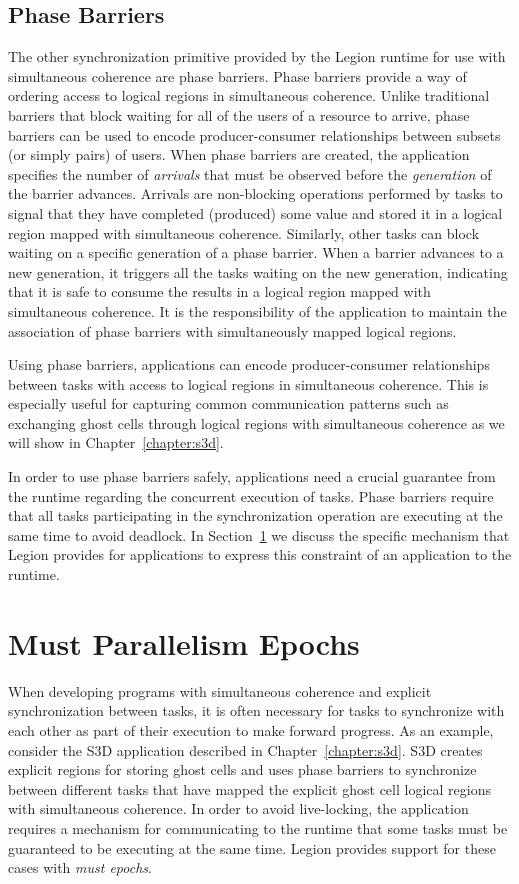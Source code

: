 \subsection{Phase Barriers}
\label{subsec:phasebarriers}
The other synchronization primitive provided by the
Legion runtime for use with simultaneous coherence
are phase barriers. Phase barriers provide a way of
ordering access to logical regions in simultaneous
coherence. Unlike traditional barriers that block
waiting for all of the users of a resource to arrive,
phase barriers can be used to encode producer-consumer
relationships between subsets (or simply pairs) of
users. When phase barriers are created, the application
specifies the number of {\em arrivals} that must be 
observed before the {\em generation} of the barrier
advances. Arrivals are non-blocking operations performed
by tasks to signal that they have completed (produced)
some value and stored it in a logical region mapped with
simultaneous coherence. Similarly, other tasks can 
block waiting on a specific generation of a phase 
barrier. When a barrier advances to a new generation,
it triggers all the tasks waiting on the new generation,
indicating that it is safe to consume the results in a
logical region mapped with simultaneous coherence. It
is the responsibility of the application to maintain the 
association of phase barriers with simultaneously 
mapped logical regions.

Using phase barriers, applications can encode
producer-consumer relationships between tasks with
access to logical regions in simultaneous coherence.
This is especially useful for capturing common
communication patterns such as exchanging ghost cells
through logical regions with simultaneous coherence
as we will show in Chapter~\ref{chapter:s3d}. 

In order to use phase barriers safely, applications
need a crucial guarantee from the runtime regarding
the concurrent execution of tasks. Phase barriers 
require that all tasks participating in the synchronization
operation are executing at the same time to avoid
deadlock. In Section~\ref{sec:mustepochs} we discuss
the specific mechanism that Legion provides for 
applications to express this constraint of 
an application to the runtime.

\section{Must Parallelism Epochs}
\label{sec:mustepochs}
When developing programs with simultaneous coherence
and explicit synchronization between tasks, it is often
necessary for tasks to synchronize with each other
as part of their execution to make forward progress.
As an example, consider the S3D application described
in Chapter~\ref{chapter:s3d}. S3D creates explicit
regions for storing ghost cells and uses phase barriers
to synchronize between different tasks that have
mapped the explicit ghost cell logical regions with
simultaneous coherence. In order to avoid live-locking,
the application requires a mechanism for communicating
to the runtime that some tasks must be guaranteed to
be executing at the same time. Legion provides 
support for these cases with {\em must epochs}.

